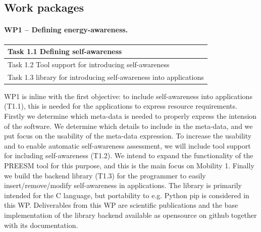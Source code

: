 \documentclass{article}
\begin{document}
\subsection{Work packages}
\paragraph{WP1 -- Defining energy-awareness.}
\begin{table}
\vspace{-0.5cm}
\small
\begin{tabular}{ | l |}
\hline
{Task 1.1 Defining self-awareness}  \\ \hline
{Task 1.2 Tool support for introducing self-awareness}  \\ \hline
{Task 1.3 library for introducing self-awareness into applications}\\ \hline
\end{tabular}
\vspace{-0.3cm}
\end{table}
WP1 is inline with the first objective: to include self-awareness into applications (T1.1), this is needed for the applications to express resource requirements.
Firstly we determine which meta-data is needed to properly express the intension of the software.
We determine which details to include in the meta-data, and we put focus on the usability of the meta-data expression.
To increase the usability and to enable automatic self-awareness assessment, we will include tool support for including self-awareness (T1.2).
We intend to expand the functionality of the PREESM tool for this purpose, and this is the main focus on Mobility 1.
Finally we build the backend library (T1.3) for the programmer to easily insert/remove/modify self-awareness in applications.
The library is primarily intended for the C language, but portability to e.g. Python pip is considered in this WP.
Deliverables from this WP are scientific publications and the base implementation of the library backend available as opensource on github together with its documentation.
\end{document}
